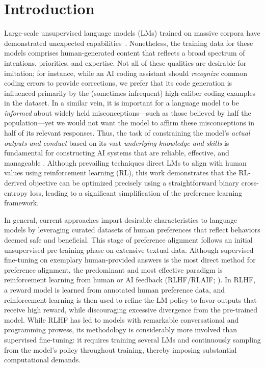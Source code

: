 \section{Introduction}
Large-scale unsupervised language models (LMs) trained on massive corpora have demonstrated unexpected capabilities~\citep{chowdhery2022palm, brown2020language, touvron2023llama,bubeck2023sparks}. Nonetheless, the training data for these models comprises human-generated content that reflects a broad spectrum of intentions, priorities, and expertise. Not all of these qualities are desirable for imitation; for instance, while an AI coding assistant should \textit{recognize} common coding errors to provide corrections, we prefer that its code generation is influenced primarily by the (sometimes infrequent) high-caliber coding examples in the dataset. In a similar vein, it is important for a language model to be \textit{informed} about widely held misconceptions—such as those believed by half the population—yet we would not want the model to affirm these misconceptions in half of its relevant responses. Thus, the task of constraining the model’s \emph{actual outputs and conduct} based on its vast \textit{underlying knowledge and skills} is fundamental for constructing AI systems that are reliable, effective, and manageable \citep{ouyang2022training}. Although prevailing techniques direct LMs to align with human values using reinforcement learning (RL), this work demonstrates that the RL-derived objective can be optimized precisely using a straightforward binary cross-entropy loss, leading to a significant simplification of the preference learning framework.

In general, current approaches impart desirable characteristics to language models by leveraging curated datasets of human preferences that reflect behaviors deemed safe and beneficial. This stage of preference alignment follows an initial unsupervised pre-training phase on extensive textual data. Although supervised fine-tuning on exemplary human-provided answers is the most direct method for preference alignment, the predominant and most effective paradigm is reinforcement learning from human or AI feedback (RLHF/RLAIF; \citep{christiano2017deep,bai2022constitutional}). In RLHF, a reward model is learned from annotated human preference data, and reinforcement learning is then used to refine the LM policy to favor outputs that receive high reward, while discouraging excessive divergence from the pre-trained model. While RLHF has led to models with remarkable conversational and programming prowess, its methodology is considerably more involved than supervised fine-tuning: it requires training several LMs and continuously sampling from the model’s policy throughout training, thereby imposing substantial computational demands.

